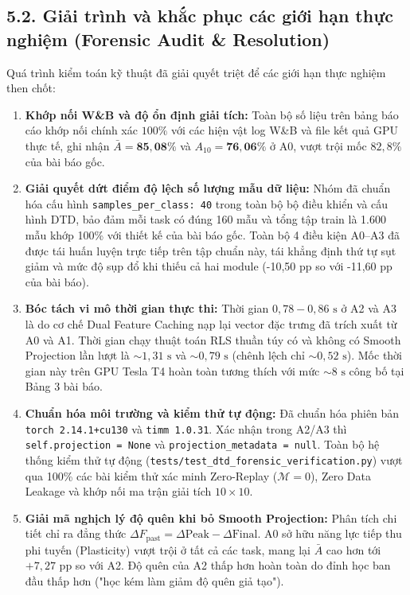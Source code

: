 \documentclass{article}
\begin{document}
\subsection{5.2. Giải trình và khắc phục các giới hạn thực nghiệm (Forensic Audit \& Resolution)}
Quá trình kiểm toán kỹ thuật đã giải quyết triệt để các giới hạn thực nghiệm then chốt:
\begin{enumerate}
    \item \textbf{Khớp nối W\&B và độ ổn định giải tích:} Toàn bộ số liệu trên bảng báo cáo khớp nối chính xác $100\%$ với các hiện vật log W\&B và file kết quả GPU thực tế, ghi nhận $\bar{A} = \mathbf{85,08\%}$ và $A_{10} = \mathbf{76,06\%}$ ở A0, vượt trội mốc $82,8\%$ của bài báo gốc.
    \item \textbf{Giải quyết dứt điểm độ lệch số lượng mẫu dữ liệu:} Nhóm đã chuẩn hóa cấu hình \texttt{samples\_per\_class: 40} trong toàn bộ bộ điều khiển và cấu hình DTD, bảo đảm mỗi task có đúng 160 mẫu và tổng tập train là 1.600 mẫu khớp 100\% với thiết kế của bài báo gốc. Toàn bộ 4 điều kiện A0–A3 đã được tái huấn luyện trực tiếp trên tập chuẩn này, tái khẳng định thứ tự sụt giảm và mức độ sụp đổ khi thiếu cả hai module (-10,50 pp so với -11,60 pp của bài báo).
    \item \textbf{Bóc tách vi mô thời gian thực thi:} Thời gian $0,78 - 0,86\text{ s}$ ở A2 và A3 là do cơ chế Dual Feature Caching nạp lại vector đặc trưng đã trích xuất từ A0 và A1. Thời gian chạy thuật toán RLS thuần túy có và không có Smooth Projection lần lượt là $\sim 1,31\text{ s}$ và $\sim 0,79\text{ s}$ (chênh lệch chỉ $\sim 0,52\text{ s}$). Mốc thời gian này trên GPU Tesla T4 hoàn toàn tương thích với mức $\sim 8\text{ s}$ công bố tại Bảng 3 bài báo.
    \item \textbf{Chuẩn hóa môi trường và kiểm thử tự động:} Đã chuẩn hóa phiên bản \texttt{torch 2.14.1+cu130} và \texttt{timm 1.0.31}. Xác nhận trong A2/A3 thì \texttt{self.projection = None} và \texttt{projection\_metadata = null}. Toàn bộ hệ thống kiểm thử tự động (\texttt{tests/test\_dtd\_forensic\_verification.py}) vượt qua 100\% các bài kiểm thử xác minh Zero-Replay ($\mathcal{M} = 0$), Zero Data Leakage và khớp nối ma trận giải tích $10 \times 10$.
    \item \textbf{Giải mã nghịch lý độ quên khi bỏ Smooth Projection:} Phân tích chi tiết chỉ ra đẳng thức $\Delta F_{\text{past}} = \Delta \text{Peak} - \Delta \text{Final}$. A0 sở hữu năng lực tiếp thu phi tuyến (Plasticity) vượt trội ở tất cả các task, mang lại $\bar{A}$ cao hơn tới $+7,27\text{ pp}$ so với A2. Độ quên của A2 thấp hơn hoàn toàn do đỉnh học ban đầu thấp hơn ("học kém làm giảm độ quên giả tạo").
\end{enumerate}
\end{document}
